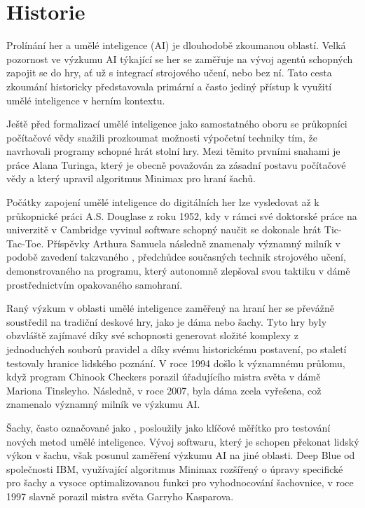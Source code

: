\section{Historie}
Prolínání her a umělé inteligence (AI) je dlouhodobě zkoumanou oblastí. Velká pozornost ve výzkumu AI týkající se her se zaměřuje na vývoj agentů schopných zapojit se do hry, ať už s integrací strojového učení, nebo bez ní. Tato cesta zkoumání historicky představovala primární a často jediný přístup k využití umělé inteligence v herním kontextu.

Ještě před formalizací umělé inteligence jako samostatného oboru se průkopníci počítačové vědy snažili prozkoumat možnosti výpočetní techniky tím, že navrhovali programy schopné hrát stolní hry. Mezi těmito prvními snahami je práce Alana Turinga, který je obecně považován za zásadní postavu počítačové vědy a který upravil algoritmus Minimax pro hraní šachů.

Počátky zapojení umělé inteligence do digitálních her lze vysledovat až k průkopnické práci A.S. Douglase z roku 1952, kdy v rámci své doktorské práce na univerzitě v Cambridge vyvinul software schopný naučit se dokonale hrát Tic-Tac-Toe. Příspěvky Arthura Samuela následně znamenaly významný milník v podobě zavedení takzvaného , předchůdce současných technik strojového učení, demonstrovaného na programu, který autonomně zlepšoval svou taktiku v dámě prostřednictvím opakovaného samohraní\cite{Samuel1959}.

Raný výzkum v oblasti umělé inteligence zaměřený na hraní her se převážně soustředil na tradiční deskové hry, jako je dáma nebo šachy. Tyto hry byly obzvláště zajímavé díky své schopnosti generovat složité komplexy z jednoduchých souborů pravidel a díky svému historickému postavení, po staletí testovaly hranice lidského poznání. V roce 1994 došlo k významnému průlomu, když program Chinook Checkers porazil úřadujícího mistra světa v dámě Mariona Tinsleyho. Následně, v roce 2007, byla dáma zcela vyřešena\cite{SBBKMLLS2007}, což znamenalo významný milník ve výzkumu AI.

\newpage

Šachy, často označované jako , posloužily jako klíčové měřítko pro testování nových metod umělé inteligence. Vývoj softwaru, který je schopen překonat lidský výkon v šachu, však posunul zaměření výzkumu AI na jiné oblasti. Deep Blue\cite{WikiDB} od společnosti IBM, využívající algoritmus Minimax rozšířený o úpravy specifické pro šachy a vysoce optimalizovanou funkci pro vyhodnocování šachovnice, v roce 1997 slavně porazil mistra světa Garryho Kasparova.

